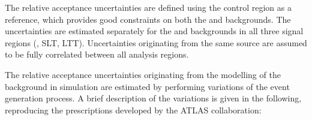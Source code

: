 
The relative acceptance uncertainties are defined using the \ZHF
control region as a reference, which provides good constraints on both
the \ZHF and \ttbar backgrounds. The uncertainties are estimated
separately for the \ZHF and \ttbar backgrounds in all three signal
regions (\hadhad, \lephad SLT, \lephad LTT). Uncertainties originating
from the same source are assumed to be fully correlated between all
analysis regions.

The relative acceptance uncertainties originating from the modelling
of the \ZHF background in simulation are estimated by performing
variations of the event generation process. A brief description of the
variations is given in the following, reproducing the prescriptions
developed by the ATLAS collaboration:
